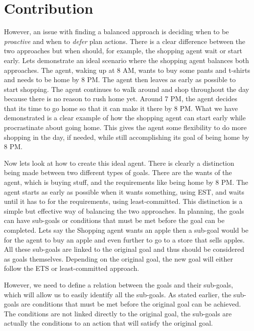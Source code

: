 \section{Contribution}

However, an issue with finding a balanced approach is deciding when to
be {\em proactive} and when to {\em defer} plan actions. There is a 
clear difference between the two approaches but when should, 
for example, the shopping agent wait or start early. 
Lets demonstrate an ideal scenario where the shopping agent balances both approaches. The agent, waking up at 8
AM, wants to buy some pants and t-shirts and needs to be home by 8
PM. The agent then leaves as early as possible to start shopping. The
agent continues to walk around and shop throughout the day because
there is no reason to rush home yet. Around 7 PM, the agent decides
that its time to go home so that it can make it there by 8 PM. What we
have demonstrated is a clear example of how the shopping agent can
start early while procrastinate about going home. This gives the agent
some flexibility to do more shopping in the day, if needed, while
still accomplishing its goal of being home by 8 PM.

Now lets look at how to create this ideal agent. There is clearly a
distinction being made between two different types of goals. There are
the wants of the agent, which is buying stuff, and the requirements
like being home by 8 PM.  The agent starts as early as possible when
it wants something, using EST, and waits until it has to for the
requirements, using least-committed. This distinction is a simple but
effective way of balancing the two approaches. In planning, the goals
can have sub-goals or conditions that must be met before the goal can
be completed. Lets say the Shopping agent wants an apple then a
sub-goal would be for the agent to buy an apple and even further to go
to a store that sells apples. All these sub-goals are linked to the
original goal and thus should be considered as goals
themselves. Depending on the original goal, the new goal will either
follow the ETS or least-committed approach.

However, we need to define a relation between the goals and their
sub-goals, which will allow us to easily identify all the
sub-goals. As stated earlier, the sub-goals are conditions that must
be met before the original goal can be achieved. The conditions are
not linked directly to the original goal, the sub-goals are actually
the conditions to an action that will satisfy the original goal.
